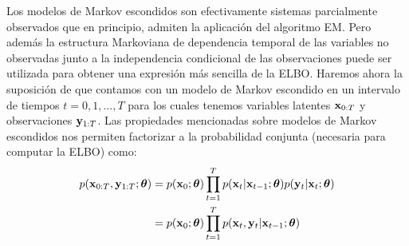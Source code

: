 Los modelos de Markov escondidos son efectivamente sistemas parcialmente observados que en principio, admiten la aplicación del algoritmo EM. Pero además la estructura Markoviana de dependencia temporal de las variables no observadas junto a la independencia condicional de las observaciones puede ser utilizada para obtener una expresión más sencilla de la ELBO. Haremos ahora la suposición de que contamos con un modelo de Markov escondido en un intervalo de tiempos $t = 0, 1, ..., T$ para los cuales tenemos variables latentes $\mathbf{x}_{0:T}$ y observaciones $\mathbf{y}_{1:T}$. Las propiedades mencionadas sobre modelos de Markov escondidos nos permiten factorizar a la probabilidad conjunta (necesaria para computar la ELBO) como:
\begin{align}
    p(\mathbf{x}_{0:T}, \mathbf{y}_{1:T} ; \mbox{\boldmath$ \theta $}) &= p(\mathbf{x}_0 ; \mbox{\boldmath$ \theta $}) \prod_{t=1}^T p(\mathbf{x}_t | \mathbf{x}_{t-1} ; \mbox{\boldmath$ \theta $}) p(\mathbf{y}_t | \mathbf{x}_t ; \mbox{\boldmath$ \theta $}) \\
    &= p(\mathbf{x}_0 ; \mbox{\boldmath$ \theta $}) \prod_{t=1}^T p(\mathbf{x}_t, \mathbf{y}_t | \mathbf{x}_{t-1} ; \mbox{\boldmath$ \theta $}) \label{eq:joint_factorization}
\end{align}

